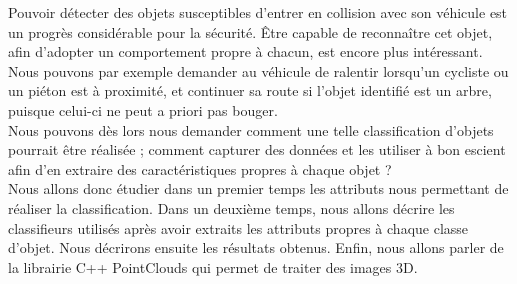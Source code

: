Pouvoir détecter des objets susceptibles d'entrer en collision avec son véhicule est un progrès considérable pour la sécurité. Être capable de reconnaître cet objet, afin d'adopter un comportement propre à chacun, est encore plus intéressant. Nous pouvons par exemple demander au véhicule de ralentir lorsqu'un cycliste ou un piéton est à proximité, et continuer sa route si l'objet identifié est un arbre, puisque celui-ci ne peut a priori pas bouger.\\

Nous pouvons dès lors nous demander comment une telle classification d'objets pourrait être réalisée ; comment capturer des données et les utiliser à bon escient afin d'en extraire des caractéristiques propres à chaque objet ?\\

Nous allons donc étudier dans un premier temps les attributs nous permettant de réaliser la classification. Dans un deuxième temps, nous allons décrire les classifieurs utilisés après avoir extraits les attributs propres à chaque classe d'objet. Nous décrirons ensuite les résultats obtenus. Enfin, nous allons parler de la librairie C++ PointClouds qui permet de traiter des images 3D.\\